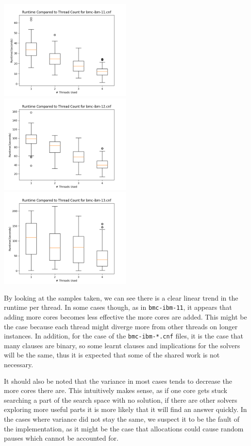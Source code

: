 \documentclass[11pt]{extarticle}
\begin{document}
\includegraphics[width=0.5\textwidth]{figures/bmc-ibm-11.png}
\includegraphics[width=0.5\textwidth]{figures/bmc-ibm-12.png}
\includegraphics[width=0.5\textwidth]{figures/bmc-ibm-13.png}


By looking at the samples taken, we can see there is a clear linear trend in the runtime per
thread. In some cases though, as in \texttt{bmc-ibm-11}, it appears that adding more cores
becomes less effective the more cores are added. This might be the case because each thread
might diverge more from other threads on longer instances. In addition, for the case of the
\texttt{bmc-ibm-*.cnf} files, it is the case that many clauses are binary, so some learnt clauses
and implications for the solvers will be the same, thus it is expected that some of the shared
work is not necessary.

It should also be noted that the variance in most cases tends to decrease the more cores there
are. This intuitively makes sense, as if one core gets stuck searching a part of the search
space with no solution, if there are other solvers exploring more useful parts it is more likely
that it will find an answer quickly. In the cases where variance did not stay the same, we
suspect it to be the fault of the implementation, as it might be the case that allocations could
cause random pauses which cannot be accounted for.
\end{document}
